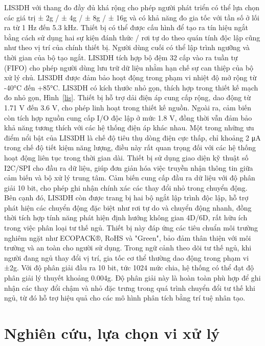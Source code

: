 LIS3DH với thang đo đầy đủ khá rộng cho phép người phát triển có thể lựa chọn các giá trị ± 2g / ± 4g / ± 8g / ± 16g và có khả năng đo gia tốc với tần số ở lối ra từ 1 Hz đến 5.3 kHz. Thiết bị có thể được cấu hình để tạo ra tín hiệu ngắt bằng cách sử dụng hai sự kiện đánh thức / rơi tự do theo quán tính độc lập cũng như theo vị trí của chính thiết bị. Người dùng cuối có thể lập trình ngưỡng và thời gian của bộ tạo ngắt. LIS3DH tích hợp bộ đệm 32 cấp vào ra tuần tự (FIFO) cho phép người dùng lưu trữ dữ liệu nhằm hạn chế sự can thiệp của bộ xử lý chủ. LIS3DH được đảm bảo hoạt động trong phạm vi nhiệt độ mở rộng từ -40°C đến +85°C. LIS3DH có kích thước nhỏ gọn, thích hợp trong thiết kế mạch đo nhỏ gọn, Hình~\ref{lis}. Thiết bị hỗ trợ dải điện áp cung cấp rộng, dao động từ 1.71 V đến 3.6 V, cho phép linh hoạt trong thiết kế nguồn. Ngoài ra, cảm biến còn tích hợp nguồn cung cấp I/O độc lập ở mức 1.8 V, đồng thời vẫn đảm bảo khả năng tương thích với các hệ thống điện áp khác nhau. Một trong những ưu điểm nổi bật của LIS3DH là chế độ tiêu thụ dòng điện cực thấp, chỉ khoảng 2 μA trong chế độ tiết kiệm năng lượng, điều này rất quan trọng đối với các hệ thống hoạt động liên tục trong thời gian dài. Thiết bị sử dụng giao diện kỹ thuật số I2C/SPI cho đầu ra dữ liệu, giúp đơn giản hóa việc truyền nhận thông tin giữa cảm biến và bộ xử lý trung tâm. Cảm biến cung cấp đầu ra dữ liệu với độ phân giải 10 bit, cho phép ghi nhận chính xác các thay đổi nhỏ trong chuyển động. Bên cạnh đó, LIS3DH còn được trang bị hai bộ ngắt lập trình độc lập, hỗ trợ phát hiện các chuyển động đặc biệt như rơi tự do và chuyển động nhanh, đồng thời tích hợp tính năng phát hiện định hướng không gian 4D/6D, rất hữu ích trong việc phân loại tư thế ngủ. Thiết bị này đáp ứng các tiêu chuẩn môi trường nghiêm ngặt như ECOPACK®, RoHS và "Green", bảo đảm thân thiện với môi trường và an toàn cho người sử dụng. Trong ngữ cảnh theo dõi tư thế ngủ, khi người đang ngủ thay đổi vị trí, gia tốc cơ thể thường dao động trong phạm vi ±2g. Với độ phân giải đầu ra 10 bit, tức 1024 mức chia, hệ thống có thể đạt độ phân giải lý thuyết khoảng 0.004g. Độ phân giải này là hoàn toàn phù hợp để ghi nhận các thay đổi chậm và nhỏ đặc trưng trong quá trình chuyển đổi tư thế khi ngủ, từ đó hỗ trợ hiệu quả cho các mô hình phân tích bằng trí tuệ nhân tạo.


\section{Nghiên cứu, lựa chọn vi xử lý}

